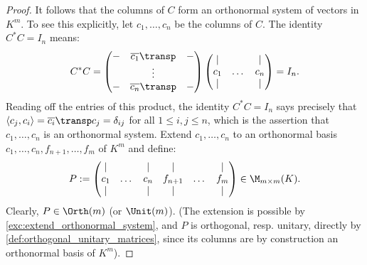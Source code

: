 \begin{proof}
It follows that the columns of $C$ form an orthonormal system of vectors in $K^m$. To see this explicitly, let $c_1, \dots, c_n$ be the columns of $C$. The identity $C^* C = I_n$ means:
\[
C^* C = 
\begin{pmatrix}
- & \overline{c_1}\transp & - \\
& \vdots & \\
- & \overline{c_n}\transp & -
\end{pmatrix}
\begin{pmatrix}
| & & | \\
c_1 & \dots & c_n \\
| & & |
\end{pmatrix}
= I_n.
\]
Reading off the entries of this product, the identity $C^* C = I_n$ says precisely that $\langle c_j, c_i \rangle = \overline{c_i}\transp c_j = \delta_{ij}$ for all $1 \leq i, j \leq n$, which is the assertion that $c_1, \dots, c_n$ is an orthonormal system.
Extend $c_1, \dots, c_n$ to an orthonormal basis $c_1, \dots, c_n, f_{n+1}, \dots, f_m$ of $K^m$ and define:
\[
P := \begin{pmatrix} | & & | & | & & | \\ c_1 & \dots & c_n & f_{n+1} & \dots & f_m \\ | & & | & | & & | \end{pmatrix} \in \M_{m \times m}(K).
\]
Clearly, $P \in \Orth(m)$ (or $\Unit(m)$).
(The extension is possible by \cref{exc:extend_orthonormal_system}, and $P$ is orthogonal, resp. unitary, directly by \cref{def:orthogonal_unitary_matrices}, since its columns are by construction an orthonormal basis of $K^m$).


\end{proof}
